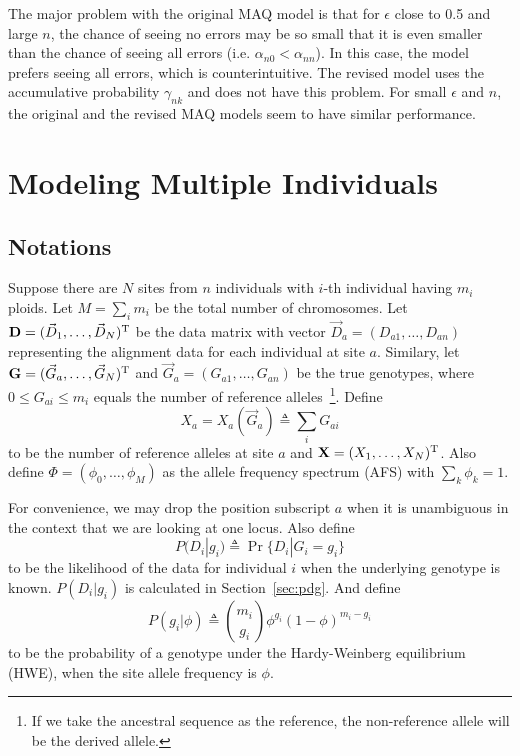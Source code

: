 \documentclass[pdftex,10pt]{book}
\begin{document}
The major problem with the original MAQ model is that for $\epsilon$
close to 0.5 and large $n$, the chance of seeing no errors may be so
small that it is even smaller than the chance of seeing all errors
(i.e. $\alpha_{n0}<\alpha_{nn}$). In this case, the model prefers seeing
all errors, which is counterintuitive. The revised model uses the
accumulative probability $\gamma_{nk}$ and does not have this problem.
For small $\epsilon$ and $n$, the original and the revised MAQ models
seem to have similar performance.

\chapter{Modeling Multiple Individuals}

\section{Notations}
Suppose there are $N$ sites from $n$ individuals with $i$-th individual
having $m_i$ ploids. Let $M=\sum_im_i$ be the total number of
chromosomes. Let ${\bf D}=(\vec{D}_1,\ldots,\vec{D}_N)^{\rm T}$ be the
data matrix with vector ${\vec D}_a=(D_{a1},\ldots,D_{an})$ representing
the alignment data for each individual at site $a$. Similary, let
\mbox{${\bf G}=(\vec{G}_a,\ldots,\vec{G}_N)^{\rm T}$} and
\mbox{$\vec{G}_a=(G_{a1},\dots,G_{an})$} be the true genotypes, where
$0\le G_{ai}\le m_i$ equals the number of reference alleles~\footnote{If we
  take the ancestral sequence as the reference, the non-reference allele
  will be the derived allele.}. Define
\begin{equation}
X_a=X_a(\vec{G}_a)\triangleq\sum_iG_{ai}
\end{equation}
to be the number of reference alleles at site $a$ and ${\bf
  X}=(X_1,\ldots,X_N)^{\rm T}$. Also define
$\Phi=(\phi_0,\ldots,\phi_M)$ as the allele frequency spectrum (AFS)
with $\sum_k\phi_k=1$.

For convenience, we may drop the position subscript $a$ when it is
unambiguous in the context that we are looking at one locus.  Also
define
\begin{equation}
P(D_i|g_i)\triangleq\Pr\{D_i|G_i=g_i\}
\end{equation}
to be the likelihood of the data for individual $i$ when the underlying
genotype is known. $P(D_i|g_i)$ is calculated in
Section~\ref{sec:pdg}. And define
\begin{equation}
P(g_i|\phi)\triangleq\binom{m_i}{g_i}\phi^{g_i}(1-\phi)^{m_i-g_i}
\end{equation}
to be the probability of a genotype under the Hardy-Weinberg equilibrium
(HWE), when the site allele frequency is $\phi$.
\end{document}

